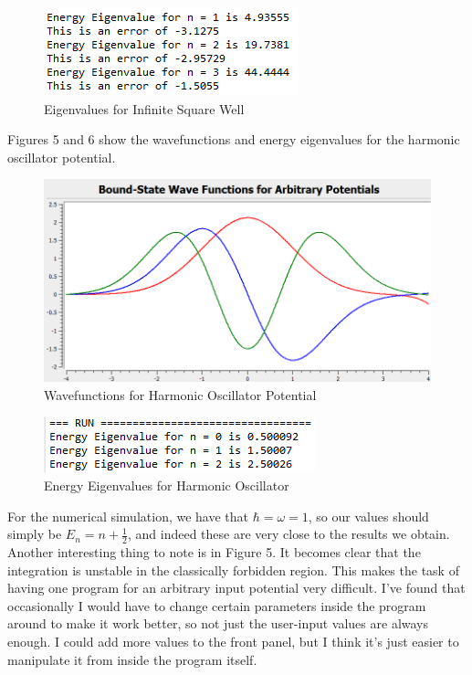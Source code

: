 \documentclass[11pt]{article} %
\begin{document}
\begin{figure}
\centering
\includegraphics{fp4}
\caption{Eigenvalues for Infinite Square Well}
\end{figure}
\par Figures 5 and 6 show the wavefunctions and energy eigenvalues for the harmonic oscillator potential. 
\begin{figure}
\centering
\includegraphics[scale = .5]{fp5}
\caption{Wavefunctions for Harmonic Oscillator Potential}
\end{figure}
\begin{figure}
\centering
\includegraphics{fp6}
\caption{Energy Eigenvalues for Harmonic Oscillator}
\end{figure}
\par For the numerical simulation, we have that $\hbar = \omega = 1$, so our values should simply be $E_n = n + \frac{1}{2}$, and indeed these are very close to the results we obtain. Another interesting thing to note is in Figure 5. It becomes clear that the integration is unstable in the classically forbidden region. This makes the task of having one program for an arbitrary input potential very difficult. I've found that occasionally I would have to change certain parameters inside the program around to make it work better, so not just the user-input values are always enough. I could add more values to the front panel, but I think it's just easier to manipulate it from inside the program itself. 
\end{document}
